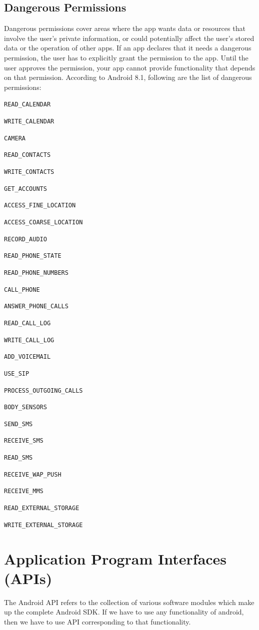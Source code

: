 \subsection{Dangerous Permissions}
Dangerous permissions cover areas where the app wants data or resources that involve the user's private information, or could potentially affect the user's stored data or the operation of other apps. If an app declares that it needs a dangerous permission, the user has to explicitly grant the permission to the app. Until the user approves the permission, your app cannot provide functionality that depends on that permission. According to Android 8.1, following are the list of dangerous permissions:
\begin{itemize}
    \begin{spacing}{0.9}
    \item \texttt{READ\_CALENDAR}
    \item \texttt{WRITE\_CALENDAR}
    \item \texttt{CAMERA}
    \item \texttt{READ\_CONTACTS}
    \item \texttt{WRITE\_CONTACTS}
    \item \texttt{GET\_ACCOUNTS}
    \item \texttt{ACCESS\_FINE\_LOCATION}
    \item \texttt{ACCESS\_COARSE\_LOCATION}
    \item \texttt{RECORD\_AUDIO}
    \item \texttt{READ\_PHONE\_STATE}
    \item \texttt{READ\_PHONE\_NUMBERS}
    \item \texttt{CALL\_PHONE}
    \item \texttt{ANSWER\_PHONE\_CALLS}
    \item \texttt{READ\_CALL\_LOG}
    \item \texttt{WRITE\_CALL\_LOG}
    \item \texttt{ADD\_VOICEMAIL}
    \item \texttt{USE\_SIP}
    \item \texttt{PROCESS\_OUTGOING\_CALLS}
    \item \texttt{BODY\_SENSORS}
    \item \texttt{SEND\_SMS}
    \item \texttt{RECEIVE\_SMS}
    \item \texttt{READ\_SMS}
    \item \texttt{RECEIVE\_WAP\_PUSH}
    \item \texttt{RECEIVE\_MMS}
    \item \texttt{READ\_EXTERNAL\_STORAGE}
    \item \texttt{WRITE\_EXTERNAL\_STORAGE}
    \end{spacing}
\end{itemize}
\section{Application Program Interfaces (APIs)}
The Android API refers to the collection of various software modules which make up the complete Android SDK. If we have to use any functionality of android, then we have to use API corresponding to that functionality.
